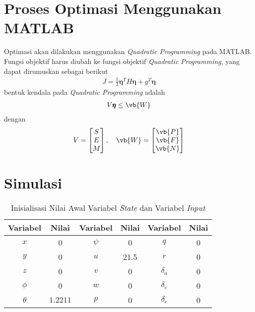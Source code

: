 \section{Proses Optimasi Menggunakan MATLAB}
Optimasi akan dilakukan menggunakan \textit{Quadratic Programming} pada MATLAB. Fungsi objektif harus diubah ke fungsi objektif \textit{Quadratic Programming}, yang dapat dirumuskan sebagai berikut
\begin{align*}
    J=\frac{1}{2}\pmb{\eta}^TH\pmb{\eta}+g^T\pmb{\eta}
\end{align*}
bentuk kendala pada \textit{Quadratic Programming} adalah
\begin{align*}
    V\pmb{\eta} \leq \vb{W}
\end{align*}
dengan
\begin{align*}
    V=\begin{bmatrix}
      S \\ E \\ M  
    \end{bmatrix}, \quad \vb{W}=\begin{bmatrix}
        \vb{P} \\ \vb{F} \\ \vb{N}
    \end{bmatrix}
\end{align*}

\section{Simulasi}

\begin{table}[htbp]
\setlength{\tabcolsep}{5pt}
    \centering
    \caption{Inisialisasi Nilai Awal Variabel \textit{State} dan Variabel \textit{Input}}
    \begin{tabular}{|c|c|c|c|c|c|}
    \hline 
        \textbf{Variabel} & \textbf{Nilai} & \textbf{Variabel} & \textbf{Nilai} & \textbf{Variabel} & \textbf{Nilai} \\
        \hline
        $x$ & 0 & $\psi$ & 0 & $q$ & 0\\
        \hline
        $y$ & 0 & $u$ & 21.5 & $r$ & 0\\
        \hline
        $z$ & 0 & $v$ & 0 & $\delta_a$ & 0\\
        \hline
        $\phi$ & 0 & $w$ & 0 & $\delta_e$ & 0 \\
        \hline
        $\theta$ & $1.2211$ & $p$ & 0 & $\delta_r$ & 0\\
        \hline
    \end{tabular}
    \label{tab: inisialisasi variabel}
\end{table}



